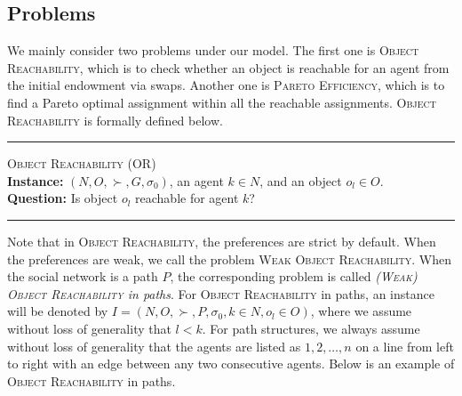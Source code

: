 \subsection{Problems}
We mainly consider two problems under our model. The first one is \textsc{Object Reachability}, which is to check whether an object is reachable for an agent from the initial endowment via swaps. Another one is \textsc{Pareto Efficiency}, which is to find a Pareto optimal assignment within all the reachable assignments.
\textsc{Object Reachability} is formally defined below.


\noindent\rule{\linewidth}{0.2mm}
\vspace{-1mm}
\textsc{Object Reachability} (OR)\\
\textbf{Instance:} $(N,O,\succ,G,\sigma _0)$, an agent $k\in N$, and an object $o_l\in O$.\\
\textbf{Question:} Is object $o_l$ reachable for agent $k$?\vspace{-0.2cm}\\
\rule{\linewidth}{0.2mm}

Note that in \textsc{Object Reachability}, the preferences are strict by default.
When the preferences are weak, we call the problem \textsc{Weak Object Reachability}.
When the social network is a path $P$, the corresponding problem is called \emph{\textsc{(Weak) Object Reachability} in paths}.
For \textsc{Object Reachability} in paths, an instance will be denoted by $I=(N,O,\succ,P,\sigma _0, k\in N, o_l\in O)$,
where we assume without loss of generality that $l<k$. For path structures, we always assume without loss of generality that the agents are listed as $1,2,\dots,n$ on a line from left to right with an edge between any two consecutive agents. Below is an example of \textsc{Object Reachability} in paths.


